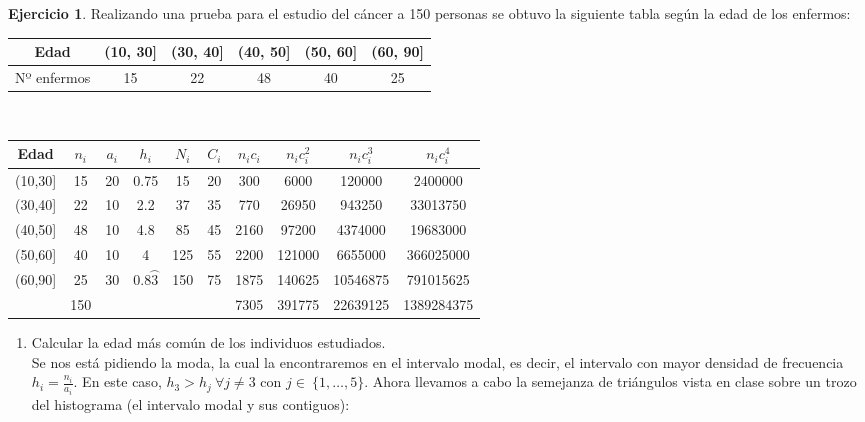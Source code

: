 \documentclass[a4paper, 12pt]{article}
\theoremstyle{definition}
\newtheorem{ej}{Ejercicio}
\begin{document}
\begin{ej}
Realizando una prueba para el estudio del cáncer a 150 personas se obtuvo la siguiente tabla según la edad de los enfermos:

\begin{center}
    \begin{tabular}{|c|c|c|c|c|c|}
    \hline
         Edad & (10, 30] & (30, 40] & (40, 50] & (50, 60] & (60, 90]  \\
         \hline
         Nº enfermos & 15 & 22 & 48 & 40 & 25 \\ 
         \hline
    \end{tabular} \\ 
    \vspace{0.5cm}
    \begin{tabular}{|c|c|c|c|c|c|c|c|c|c|} 
    \hline
         Edad & $n_{i}$ & $a_{i}$ & $h_{i}$ & $N_{i}$ & $C_{i}$ & $n_{i}c_{i}$ & $n_{i}c_{i}^2$ & $n_{i}c_{i}^3$ & $n_{i}c_{i}^4$ \\
         \hline
         (10,30] & 15 & 20 & 0.75 & 15 & 20 & 300 & 6000 & 120000 & 2400000\\ 
         \hline
         (30,40] & 22 & 10 & 2.2 & 37 & 35 & 770 & 26950 & 943250 & 33013750\\ 
         \hline
         (40,50] & 48 & 10 & 4.8 & 85 & 45 & 2160 & 97200 & 4374000 & 19683000\\ 
         \hline
         (50,60] & 40 & 10 & 4 & 125 & 55 & 2200 & 121000 & 6655000 & 366025000\\ 
         \hline
         (60,90] & 25 & 30 & $0.8\wideparen{3}$ & 150 & 75 & 1875 & 140625 & 10546875 & 791015625\\ 
         \hline
         & 150 & & & & & 7305 & 391775 & 22639125 & 1389284375 \\ 
    \end{tabular}
\end{center}

\begin{enumerate}[label=\textit{\alph*)}]
    \item Calcular la edad más común de los individuos estudiados. \\
    Se nos está pidiendo la moda, la cual la encontraremos en el intervalo modal, es decir, el intervalo con mayor densidad de frecuencia $h_{i} = \frac{n_{i}}{a_{i}}$. En este caso, $h_{3} > h_{j} \ \forall j \not = 3$ con $j \in \ \{1,\dots,5\}$. Ahora llevamos a cabo la semejanza de triángulos vista en clase sobre un trozo del histograma (el intervalo modal y sus contiguos): \\
    

\end{enumerate}
\end{ej}
\end{document}
